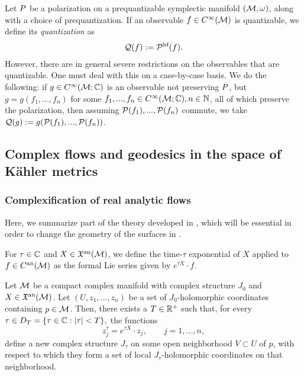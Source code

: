 \documentclass[notas.tex]{subfiles} 				%
\begin{document}
\begin{rem} \label{rem_full_quantization}
	Let $P$ be a polarization on a prequantizable symplectic manifold $(\mathcal{M}, \omega)$, along with a choice of prequantization. If an observable $f \in C^\infty(\mathcal{M})$ is quantizable, we define its \emph{quantization} as 
	\begin{align*}
		\mathcal{Q}(f) := \mathcal{\mathcal{P}^\text{hf}}(f).
	\end{align*}
	However, there are in general severe restrictions on the observables that are quantizable. One must deal with this on a case-by-case basis. We do the following: if $g \in C^\infty(\mathcal{M}; \mathbb{C})$ is an observable not preserving $P$, but $g = g(f_1,...,f_n)$ for some $f_1,...,f_n \in C^\infty(\mathcal{M}; \mathbb{C}), n \in \mathbb{N}$, all of which preserve the polarization, then assuming $\mathcal{P}(f_1),...,\mathcal{P}(f_n)$ commute, we take $\mathcal{Q}(g) := g(\mathcal{P}(f_1),...,\mathcal{P}(f_n))$.
\end{rem}

\subsection{Complex flows and geodesics in the space of Kähler metrics} \label{sec_complex_flows}

\subsubsection{Complexification of real analytic flows} 
Here, we summarize part of the theory developed in \cite{mourao_complexified_2015}, which will be essential in order to change the geometry of the surfaces in .

\begin{defn}\label{def_lie_series}
	For $\tau \in \mathbb{C}$ and $X \in \mathfrak{X}^{\text{an}}(\mathcal{M})$, we define the time-$\tau$ exponential of $X$ applied to $f \in C^{\text{an}}(\mathcal{M})$ as the formal Lie series given by $e^{\tau X} \cdot f$.
\end{defn}

\begin{thm} \label{thm_coordinate_evolution}
Let $\mathcal{M}$ be a compact complex manifold with complex structure $J_0$ and $X \in \mathfrak{X}^{\text{an}}(\mathcal{M})$. Let $(U, z_1,...,z_n)$ be a set of $J_0$-holomorphic coordinates containing $p \in \mathcal{M}$. Then, there exists a $T \in \mathbb{R}^+$ such that, for every $\tau \in D_T = \{\tau \in \mathbb{C} : \left|\tau\right| < T\},$ the functions
\[z_j^\tau = e^{\tau X} \cdot z_j, \qquad j = 1,...,n,\]
define a new complex structure $J_\tau$ on some open neighborhood $V \subset U$ of $p$, with respect to which they form a set of local $J_\tau$-holomorphic coordinates on that neighborhood.
\end{thm}
\end{document}
